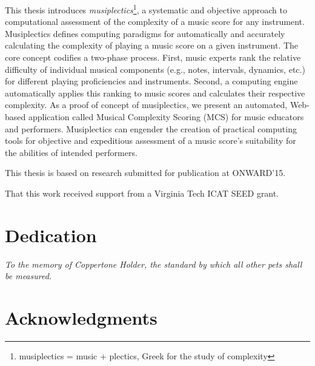 \documentclass[12pt]{report}
\begin{document}
This thesis introduces \emph{musiplectics}\footnote{musiplectics = music + plectics, Greek for the study of complexity}, a systematic and objective approach to computational assessment of the complexity of a music score for any instrument. Musiplectics defines computing paradigms for automatically and accurately calculating the complexity of playing a music score on a given instrument. The core concept codifies a two-phase process. First, music experts rank the relative difficulty of individual musical components (e.g., notes, intervals, dynamics, etc.) for different playing proficiencies and instruments. Second, a computing engine automatically applies this ranking to music scores and calculates their respective complexity. As a proof of concept of musiplectics, we present an automated, Web-based application called Musical Complexity Scoring (MCS) for music educators and performers. Musiplectics can engender the creation of practical computing tools for objective and expeditious assessment of a music score's suitability for the abilities of intended performers.

This thesis is based on research submitted for publication at ONWARD'15.

\vfill


That this work received support from a Virginia Tech ICAT SEED grant.

\pagebreak


\chapter*{Dedication}

\thispagestyle{empty}

\begin{center}

\vfill


\textit{To the memory of Coppertone Holder, the standard by which all other pets shall be measured.}

\vfill

\end{center}

\pagebreak

\chapter*{Acknowledgments}
\end{document}
